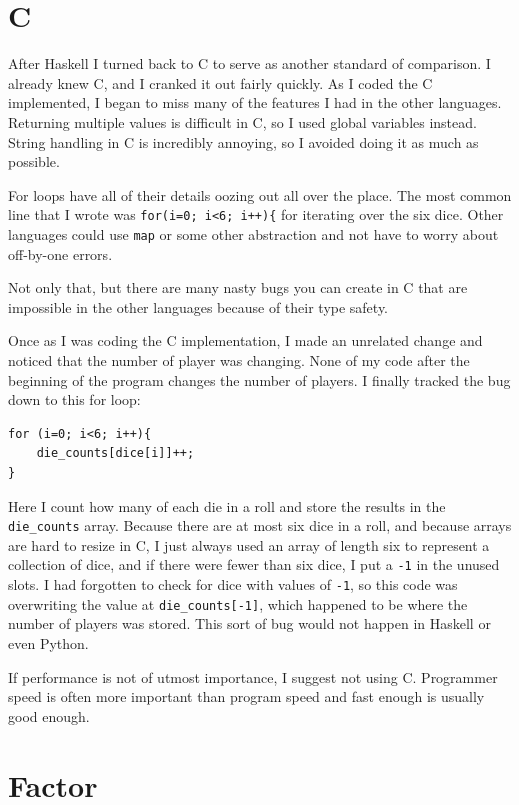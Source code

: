 \documentclass{article}
\begin{document}
\section{C}

After Haskell I turned back to C to serve as another standard of comparison.
I already knew C, and I cranked it out fairly quickly.  As I coded the C
implemented, I began to miss many of the features I had in the other languages.
Returning multiple values is difficult in C, so I used global variables instead.
String handling in C is incredibly annoying, so I avoided doing it as much as
possible.

For loops have all of their details oozing out all over the place.  The most
common line that I wrote was \texttt{for(i=0; i<6; i++)\{} for iterating over
the six dice.  Other languages could use \texttt{map} or some other abstraction
and not have to worry about off-by-one errors.

Not only that, but there are many nasty bugs you can create in C that are
impossible in the other languages because of their type safety.  

Once as I was coding the C implementation, I made an unrelated change and
noticed that the number of player was changing.  None of my code after the
beginning of the program changes the number of players.  I finally tracked the
bug down to this for loop:

\begin{verbatim}
for (i=0; i<6; i++){
    die_counts[dice[i]]++;
}
\end{verbatim}

Here I count how many of each die in a roll and store the results in the
\texttt{die\_counts} array.  Because there are at most six dice in a roll, and because
arrays are hard to resize in C, I just always used an array of length six to
represent a collection of dice, and if there were fewer than six dice, I put a
\texttt{-1} in the unused slots.  I had forgotten to check for dice with values
of \texttt{-1}, so this code was overwriting the value at
\texttt{die\_counts[-1]}, which happened to be where the number of players was
stored.  This sort of bug would not happen in Haskell or even Python.

If performance is not of utmost importance, I suggest not using C.  Programmer
speed is often more important than program speed and fast enough is usually good
enough.

\section{Factor}
\end{document}
